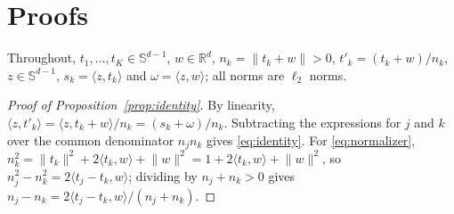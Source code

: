 \section{Proofs}
\label{app:proofs}

Throughout, $t_1,\dots,t_K\in\mathbb S^{d-1}$, $w\in\mathbb R^d$,
$n_k=\lVert t_k+w\rVert>0$, $t'_k=(t_k+w)/n_k$, $z\in\mathbb S^{d-1}$,
$s_k=\langle z,t_k\rangle$ and $\omega=\langle z,w\rangle$; all norms are
$\ell_2$ norms.

\begin{proof}[Proof of Proposition~\ref{prop:identity}]
By linearity, $\langle z,t'_k\rangle=\langle z,t_k+w\rangle/n_k=(s_k+\omega)/n_k$.
Subtracting the expressions for $j$ and $k$ over the common denominator
$n_jn_k$ gives \eqref{eq:identity}. For \eqref{eq:normalizer},
$n_k^2=\lVert t_k\rVert^2+2\langle t_k,w\rangle+\lVert w\rVert^2
=1+2\langle t_k,w\rangle+\lVert w\rVert^2$, so
$n_j^2-n_k^2=2\langle t_j-t_k,w\rangle$; dividing by $n_j+n_k>0$ gives
$n_j-n_k=2\langle t_j-t_k,w\rangle/(n_j+n_k)$.
\end{proof}


